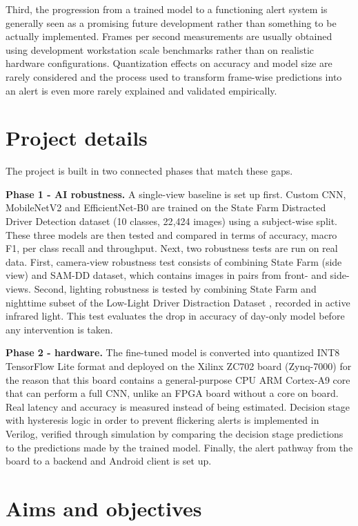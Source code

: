 Third, the progression from a trained model to a functioning alert system is generally seen as a promising future development rather than something to be actually implemented. Frames per second measurements are usually obtained using development workstation scale benchmarks rather than on realistic hardware configurations. Quantization effects on accuracy and model size are rarely considered and the process used to transform frame-wise predictions into an alert is even more rarely explained and validated empirically.

\section{Project details}

The project is built in two connected phases that match these gaps.

\textbf{Phase 1 - AI robustness.} A single-view baseline is set up first. Custom CNN, MobileNetV2 and EfficientNet-B0 are trained on the State Farm Distracted Driver Detection dataset (10 classes, 22{,}424 images) using a subject-wise split. These three models are then tested and compared in terms of accuracy, macro F1, per class recall and throughput. Next, two robustness tests are run on real data. First, camera-view robustness test consists of combining State Farm (side view) and SAM-DD dataset, which contains images in pairs from front- and side-views. Second, lighting robustness is tested by combining State Farm and nighttime subset of the Low-Light Driver Distraction Dataset \citep{saad2020lowlight}, recorded in active infrared light. This test evaluates the drop in accuracy of day-only model before any intervention is taken.

\textbf{Phase 2 - hardware.} The fine-tuned model is converted into quantized INT8 TensorFlow Lite format and deployed on the Xilinx ZC702 board (Zynq-7000) for the reason that this board contains a general-purpose CPU ARM Cortex-A9 core that can perform a full CNN, unlike an FPGA board without a core on board. Real latency and accuracy is measured instead of being estimated. Decision stage with hysteresis logic in order to prevent flickering alerts is implemented in Verilog, verified through simulation by comparing the decision stage predictions to the predictions made by the trained model. Finally, the alert pathway from the board to a backend and Android client is set up.

\section{Aims and objectives}

